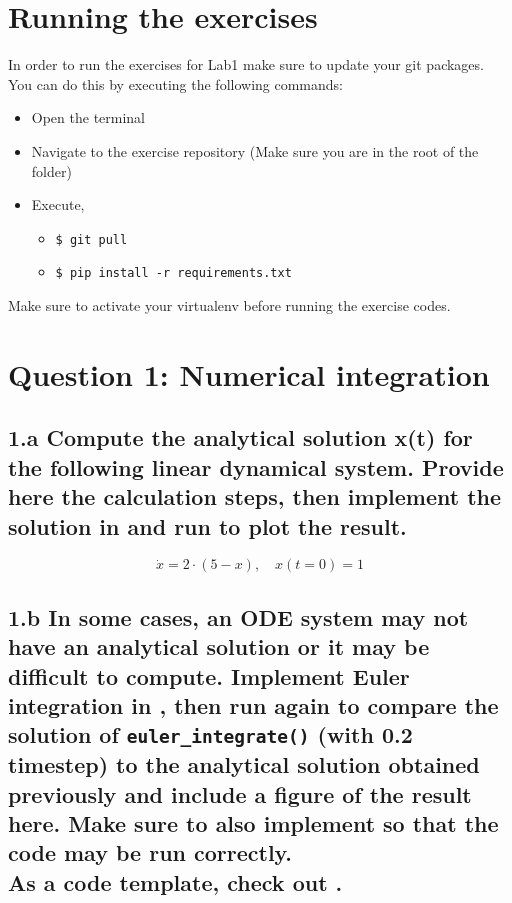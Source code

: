 \documentclass{cmc}
\begin{document}
\section*{Running the exercises}
\label{sec:inst-depend}

In order to run the exercises for Lab1 make sure to update your git packages.
You can do this by executing the following commands:

\begin{itemize}
\item Open the terminal
\item Navigate to the exercise repository (Make sure you are in the
  root of the folder)
\item Execute,
  \begin{itemize}
  \item \lstinline[columns=fixed]{$ git pull}
  \item \lstinline[columns=fixed]{$ pip install -r requirements.txt}
  \end{itemize}
\end{itemize}


 Make sure to activate your virtualenv before running the exercise
codes.

\newpage
\section*{Question 1: Numerical integration}

\subsection*{1.a Compute the analytical solution x(t) %
  for the following linear dynamical system. Provide here the calculation steps,
  then implement the solution in
  and run  to plot the result.}

\begin{equation}
  \label{eq:ode-1}
  \dot{x} = 2 \cdot (5 - x), \quad x(t=0)=1
\end{equation}


\vspace{0.3\textheight}


\newpage
\subsection*{1.b In some cases, an ODE system may not have an analytical
  solution or it may be difficult to compute. Implement Euler integration in
  , %
  then run  again to compare the solution of
  \texttt{eu\-ler\_integr\-ate()} (with 0.2 timestep) %
  to the analytical solution obtained previously and include a figure of the
  result here. Make sure to also implement
  so that the code may be run correctly. \\ As a code template, check out
  .}
\end{document}
